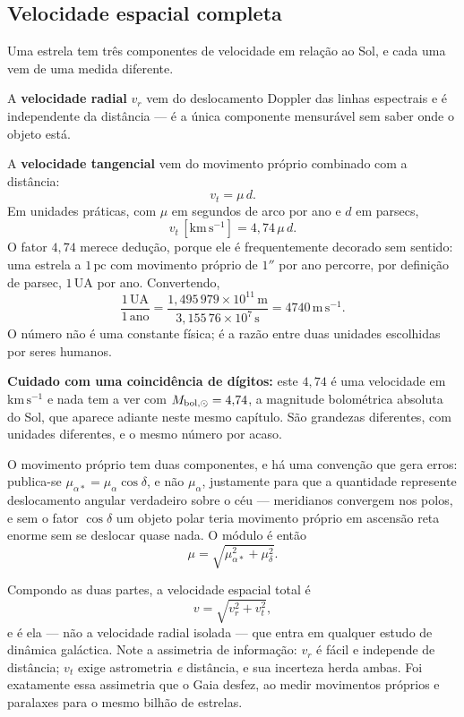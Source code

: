 \documentclass[11pt,a4paper]{article}
\begin{document}
\subsection*{Velocidade espacial completa}

Uma estrela tem três componentes de velocidade em relação ao Sol, e cada uma vem de uma medida diferente.

A \textbf{velocidade radial} $v_r$ vem do deslocamento Doppler das linhas espectrais e é independente da distância --- é a única componente mensurável sem saber onde o objeto está.

A \textbf{velocidade tangencial} vem do movimento próprio combinado com a distância:
\[
v_t=\mu\,d.
\]
Em unidades práticas, com $\mu$ em segundos de arco por ano e $d$ em parsecs,
\[
v_t\,[\mathrm{km\,s^{-1}}]=4{,}74\,\mu\,d.
\]
O fator $4{,}74$ merece dedução, porque ele é frequentemente decorado sem sentido: uma estrela a $1\,\mathrm{pc}$ com movimento próprio de $1''$ por ano percorre, por definição de parsec, $1\,\mathrm{UA}$ por ano. Convertendo,
\[
\frac{1\,\mathrm{UA}}{1\,\mathrm{ano}}=\frac{1{,}495\,979\times10^{11}\,\mathrm{m}}{3{,}155\,76\times10^{7}\,\mathrm{s}}=4740\,\mathrm{m\,s^{-1}}.
\]
O número não é uma constante física; é a razão entre duas unidades escolhidas por seres humanos.

\textbf{Cuidado com uma coincidência de dígitos:} este $4{,}74$ é uma velocidade em $\mathrm{km\,s^{-1}}$ e nada tem a ver com $M_{{\rm bol},\odot}=4{,}74$, a magnitude bolométrica absoluta do Sol, que aparece adiante neste mesmo capítulo. São grandezas diferentes, com unidades diferentes, e o mesmo número por acaso.

O movimento próprio tem duas componentes, e há uma convenção que gera erros: publica-se $\mu_{\alpha*}=\mu_\alpha\cos\delta$, e não $\mu_\alpha$, justamente para que a quantidade represente deslocamento angular verdadeiro sobre o céu --- meridianos convergem nos polos, e sem o fator $\cos\delta$ um objeto polar teria movimento próprio em ascensão reta enorme sem se deslocar quase nada. O módulo é então
\[
\mu=\sqrt{\mu_{\alpha*}^{2}+\mu_\delta^{2}}.
\]

Compondo as duas partes, a velocidade espacial total é
\[
v=\sqrt{v_r^{2}+v_t^{2}},
\]
e é ela --- não a velocidade radial isolada --- que entra em qualquer estudo de dinâmica galáctica. Note a assimetria de informação: $v_r$ é fácil e independe de distância; $v_t$ exige astrometria \emph{e} distância, e sua incerteza herda ambas. Foi exatamente essa assimetria que o Gaia desfez, ao medir movimentos próprios e paralaxes para o mesmo bilhão de estrelas.
\end{document}

